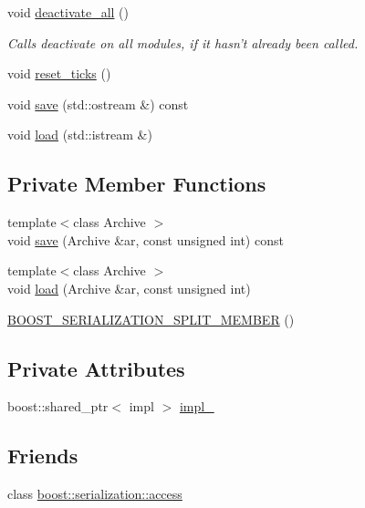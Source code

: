 \begin{DoxyCompactItemize}
void \hyperlink{structecto_1_1plasm_a6c10f2812f731c3787e5e22bdd80e9bc}{deactivate\-\_\-all} ()
\begin{DoxyCompactList}\small\item\em \-Calls deactivate on all modules, if it hasn't already been called. \end{DoxyCompactList}\item 
void \hyperlink{structecto_1_1plasm_a992f656fa931efc20d2cf1a97c963cec}{reset\-\_\-ticks} ()
\item 
void \hyperlink{structecto_1_1plasm_ab0fd6bec2e5d8943363fe5aa36c1d676}{save} (std\-::ostream \&) const 
\item 
void \hyperlink{structecto_1_1plasm_a854400c2f46f995731e058c72a547185}{load} (std\-::istream \&)
\end{DoxyCompactItemize}
\subsection*{\-Private \-Member \-Functions}
\begin{DoxyCompactItemize}
\item 
{\footnotesize template$<$class Archive $>$ }\\void \hyperlink{structecto_1_1plasm_a420eb464746042e8247a69828e6782af}{save} (\-Archive \&ar, const unsigned int) const 
\item 
{\footnotesize template$<$class Archive $>$ }\\void \hyperlink{structecto_1_1plasm_ae6540bca37d0980ec24b0b75061e124e}{load} (\-Archive \&ar, const unsigned int)
\item 
\hyperlink{structecto_1_1plasm_ac443cf0a58324a8003e1c9fd3b49b428}{\-B\-O\-O\-S\-T\-\_\-\-S\-E\-R\-I\-A\-L\-I\-Z\-A\-T\-I\-O\-N\-\_\-\-S\-P\-L\-I\-T\-\_\-\-M\-E\-M\-B\-E\-R} ()
\end{DoxyCompactItemize}
\subsection*{\-Private \-Attributes}
\begin{DoxyCompactItemize}
\item 
boost\-::shared\-\_\-ptr$<$ impl $>$ \hyperlink{structecto_1_1plasm_a4cfd41e9dc82039a75970755565b2513}{impl\-\_\-}
\end{DoxyCompactItemize}
\subsection*{\-Friends}
\begin{DoxyCompactItemize}
\item 
class \hyperlink{structecto_1_1plasm_ac98d07dd8f7b70e16ccb9a01abf56b9c}{boost\-::serialization\-::access}
\end{DoxyCompactItemize}



